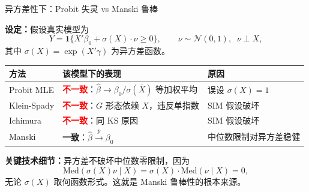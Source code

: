 \documentclass[aspectratio=169, 10pt]{beamer}
\begin{document}
\begin{frame}{异方差性下：Probit 失灵 vs Manski 鲁棒}

  \textbf{设定：}假设真实模型为
  $$Y = \mathbf{1}\{X'\beta_0 + \sigma(X) \cdot \nu \geq 0\}, \qquad \nu \sim \mathcal{N}(0,1), \;\; \nu \perp X,$$
  其中 $\sigma(X) = \exp(X'\gamma)$ 为异方差函数。

  \begin{center}\footnotesize
  \begin{tabular}{p{3cm}|p{5cm}|p{5cm}}
  \hline
  方法 & 该模型下的表现 & 原因 \\
  \hline
  Probit MLE & \textcolor{red}{\textbf{不一致}}：$\hat\beta \to \beta_0/\sigma(\bar X)$ 等加权平均 & 误设 $\sigma(X) = 1$ \\
  \hline
  Klein-Spady & \textcolor{red}{\textbf{不一致}}：$G$ 形态依赖 $X$，违反单指数 & SIM 假设破坏 \\
  \hline
  Ichimura & \textcolor{red}{\textbf{不一致}}：同 KS 原因 & SIM 假设破坏 \\
  \hline
  Manski & \textcolor{green!60!black}{\textbf{一致}}：$\hat\beta \overset{p}{\to} \beta_0$ & 中位数限制对异方差稳健 \\
  \hline
  \end{tabular}
  \end{center}

  \begin{highlightbox}
    \textbf{关键技术细节：}异方差不破坏中位数零限制，因为
    $$\text{Med}(\sigma(X) \nu \mid X) = \sigma(X) \cdot \text{Med}(\nu \mid X) = 0,$$
    无论 $\sigma(X)$ 取何函数形式。这就是 Manski 鲁棒性的根本来源。
  \end{highlightbox}

\end{frame}
\end{document}
